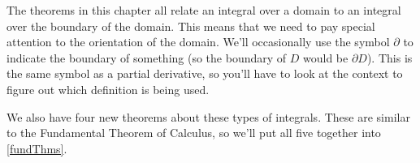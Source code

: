 The theorems in this chapter all relate an integral over a domain to an integral over the boundary of the domain.  This means that we need to pay special attention to the orientation of the domain.  We'll occasionally use the symbol $\partial$ to indicate the boundary of something (so the boundary of $D$ would be $\partial D$).  This is the same symbol as a partial derivative, so you'll have to look at the context to figure out which definition is being used.

We also have four new theorems about these types of integrals. These are similar to the Fundamental Theorem of Calculus, so we'll put all five together into \autoref{fundThms}.

{
}

